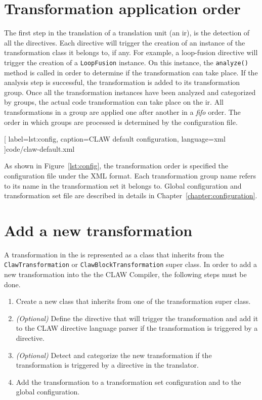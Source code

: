 \section{Transformation application order}
The first step in the translation of a translation unit (an \xcodeml \gls{ir}),
is the detection of all the directives. Each directive will trigger the
creation of an instance of the transformation class it belongs to, if any.
For example, a loop-fusion directive will trigger the creation of a
\lstinline|LoopFusion| instance. On this instance, the \lstinline|analyze()|
method is called in order to determine if the transformation can take place.
If the analysis step is successful, the transformation is added to its
transformation group. Once all the transformation instances have been analyzed
and categorized by groups, the actual code transformation can take place on
the \xcodeml \gls{ir}. All transformations in a group are applied one after
another in a \textit{fifo} order. The order in which groups are processed is
determined by the configuration file.


  [
    label=lst:config,
    caption=CLAW default configuration,
    language=xml
  ]{code/claw-default.xml}

As shown in Figure~\ref{lst:config}, the transformation order is specified the
configuration file under the XML format.
Each transformation group name refers to its name in the transformation set it
belongs to. Global configuration and transformation set file are described in
details in Chapter~\ref{chapter:configuration}.

\section{Add a new transformation}
\label{section:new_trans}
A transformation in the \clawfc is represented as a class that inherits from
the \lstinline|ClawTransformation| or \lstinline|ClawBlockTransformation|
super class. In order to add a new transformation into the the CLAW Compiler,
the following steps must be done.

\begin{enumerate}
\item Create a new class that inherits from one of the transformation
      super class.
\item \textit{(Optional)} Define the directive that will trigger the
      transformation and add it to the CLAW directive language parser if the
      transformation is triggered by a directive.
\item \textit{(Optional)} Detect and categorize the new transformation if the
      transformation is triggered by a directive in the translator.
\item Add the transformation to a transformation set configuration and to
      the global configuration.
\end{enumerate}

